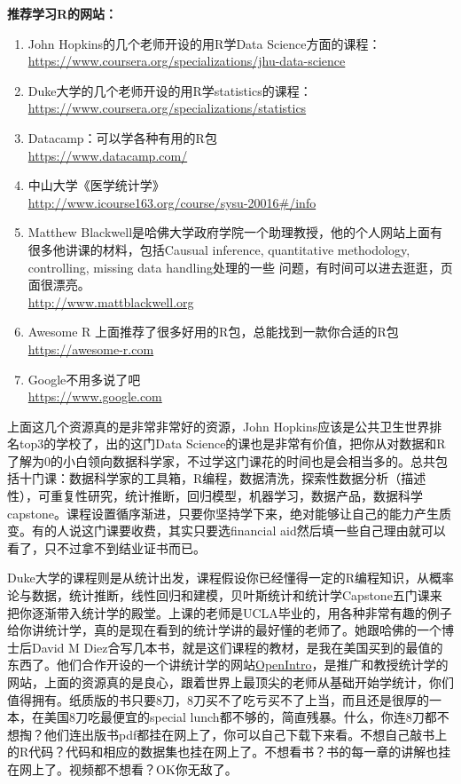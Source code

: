 \documentclass[11pt, a4paper]{article}
\begin{document}
\textbf{推荐学习R的网站：}
\begin{enumerate}[(1)]
	\item John Hopkins的几个老师开设的用R学Data Science方面的课程：\\ \url{https://www.coursera.org/specializations/jhu-data-science}
	\item Duke大学的几个老师开设的用R学statistics的课程：\\ \url{https://www.coursera.org/specializations/statistics}
	\item Datacamp：可以学各种有用的R包 \\ \url{https://www.datacamp.com/}
	\item 中山大学《医学统计学》\\ \url{http://www.icourse163.org/course/sysu-20016#/info}
	\item Matthew Blackwell是哈佛大学政府学院一个助理教授，他的个人网站上面有很多他讲课的材料，包括Causual inference, quantitative methodology, controlling, missing data handling处理的一些 问题，有时间可以进去逛逛，页面很漂亮。 \\ \url{http://www.mattblackwell.org}
	\item Awesome R 上面推荐了很多好用的R包，总能找到一款你合适的R包\\ \url{https://awesome-r.com} 
	\item Google不用多说了吧 \\ \url{https://www.google.com}
\end{enumerate}

上面这几个资源真的是非常非常好的资源，John Hopkins应该是公共卫生世界排名top3的学校了，出的这门Data Science的课也是非常有价值，把你从对数据和R了解为0的小白领向数据科学家，不过学这门课花的时间也是会相当多的。总共包括十门课：数据科学家的工具箱，R编程，数据清洗，探索性数据分析（描述性），可重复性研究，统计推断，回归模型，机器学习，数据产品，数据科学capstone。课程设置循序渐进，只要你坚持学下来，绝对能够让自己的能力产生质变。有的人说这门课要收费，其实只要选financial aid然后填一些自己理由就可以看了，只不过拿不到结业证书而已。

Duke大学的课程则是从统计出发，课程假设你已经懂得一定的R编程知识，从概率论与数据，统计推断，线性回归和建模，贝叶斯统计和统计学Capstone五门课来把你逐渐带入统计学的殿堂。上课的老师是UCLA毕业的，用各种非常有趣的例子给你讲统计学，真的是现在看到的统计学讲的最好懂的老师了。她跟哈佛的一个博士后David M Diez合写几本书，就是这们课程的教材，是我在美国买到的最值的东西了。他们合作开设的一个讲统计学的网站\href{https://www.openintro.org/}{OpenIntro}，是推广和教授统计学的网站，上面的资源真的是良心，跟着世界上最顶尖的老师从基础开始学统计，你们值得拥有。纸质版的书只要8刀，8刀买不了吃亏买不了上当，而且还是很厚的一本，在美国8刀吃最便宜的special lunch都不够的，简直残暴。什么，你连8刀都不想掏？他们连出版书pdf都挂在网上了，你可以自己下载下来看。不想自己敲书上的R代码？代码和相应的数据集也挂在网上了。不想看书？书的每一章的讲解也挂在网上了。视频都不想看？OK你无敌了。
\end{document}
